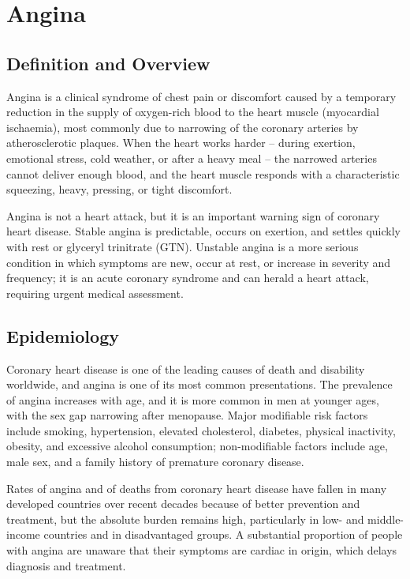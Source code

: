 \chapter{Angina}

\section*{Definition and Overview}
Angina is a clinical syndrome of chest pain or discomfort caused by a temporary reduction in the supply of oxygen-rich blood to the heart muscle (myocardial ischaemia), most commonly due to narrowing of the coronary arteries by atherosclerotic plaques. When the heart works harder -- during exertion, emotional stress, cold weather, or after a heavy meal -- the narrowed arteries cannot deliver enough blood, and the heart muscle responds with a characteristic squeezing, heavy, pressing, or tight discomfort.

Angina is not a heart attack, but it is an important warning sign of coronary heart disease. Stable angina is predictable, occurs on exertion, and settles quickly with rest or glyceryl trinitrate (GTN). Unstable angina is a more serious condition in which symptoms are new, occur at rest, or increase in severity and frequency; it is an acute coronary syndrome and can herald a heart attack, requiring urgent medical assessment.

\section*{Epidemiology}
Coronary heart disease is one of the leading causes of death and disability worldwide, and angina is one of its most common presentations. The prevalence of angina increases with age, and it is more common in men at younger ages, with the sex gap narrowing after menopause. Major modifiable risk factors include smoking, hypertension, elevated cholesterol, diabetes, physical inactivity, obesity, and excessive alcohol consumption; non-modifiable factors include age, male sex, and a family history of premature coronary disease.

Rates of angina and of deaths from coronary heart disease have fallen in many developed countries over recent decades because of better prevention and treatment, but the absolute burden remains high, particularly in low- and middle-income countries and in disadvantaged groups. A substantial proportion of people with angina are unaware that their symptoms are cardiac in origin, which delays diagnosis and treatment.

